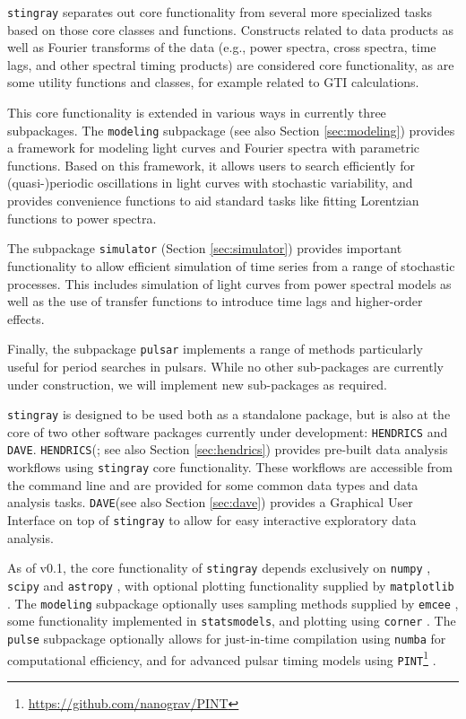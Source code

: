 \documentclass[twocolumn]{aastex62}
\newcommand{\stingray}{\texttt{stingray}\xspace}
\newcommand{\hendrics}{\texttt{HENDRICS}\xspace}
\newcommand{\dave}{\texttt{DAVE}\xspace}
\begin{document}
\stingray separates out core functionality from several more specialized tasks based on those core classes and functions. Constructs related to data products as well as Fourier transforms of the data (e.g., power spectra, cross spectra, time lags, and other spectral timing products) are considered core functionality, as are some utility functions and classes, for example related to GTI calculations. 

This core functionality is extended in various ways in currently three subpackages. 
The \texttt{modeling} subpackage (see also Section \ref{sec:modeling}) provides a framework for modeling light curves and Fourier spectra with parametric functions. 
Based on this framework, it allows users to search efficiently for (quasi-)periodic oscillations in light curves with stochastic variability, and provides convenience functions to aid standard tasks like fitting Lorentzian functions to power spectra. 

The subpackage \texttt{simulator} (Section \ref{sec:simulator}) provides important functionality to allow efficient simulation of time series from a range of stochastic processes. This includes simulation of light curves from power spectral models as well as the use of transfer functions to introduce time lags and higher-order effects. 

Finally, the subpackage \texttt{pulsar} implements a range of methods particularly useful for period searches in pulsars. While no other sub-packages are currently under construction, we will implement new sub-packages as required. 

\stingray is designed to be used both as a standalone package, but is also at the core of two other software packages currently under development: 
\hendrics and \dave. 
\hendrics (\citealt{hendrics}; see also Section \ref{sec:hendrics}) provides pre-built data analysis workflows using \stingray core functionality. 
These workflows are accessible from the command line and are provided for some common data types and data analysis tasks. 
\dave (see also Section \ref{sec:dave}) provides a Graphical User Interface on top of \stingray to allow for easy interactive exploratory data analysis.
 
As of v0.1, the core functionality of \stingray depends exclusively on \texttt{numpy} \citep{numpy}, \texttt{scipy} \citep{scipy} and \texttt{astropy} \citep{astropy}, with optional plotting functionality supplied by \texttt{matplotlib} \citep{matplotlib} . 
The \texttt{modeling} subpackage optionally uses sampling methods supplied by \texttt{emcee} \citep{emcee}, some functionality implemented in \texttt{statsmodels}, and plotting using \texttt{corner} \citep{corner}. 
The \texttt{pulse} subpackage optionally allows for just-in-time compilation using \texttt{numba} \citep{numba} for computational efficiency, and for advanced pulsar timing models using \texttt{PINT}\footnote{\url{https://github.com/nanograv/PINT}} .
\end{document}
